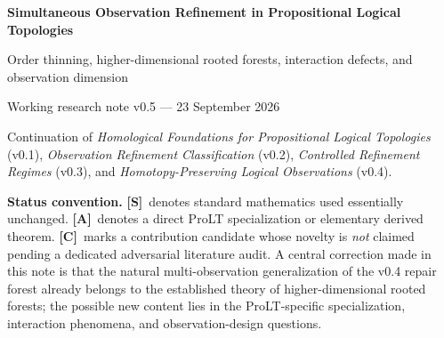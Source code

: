 \documentclass[11pt]{article}
\theoremstyle{definition}
\newcommand{\statusS}{\textbf{[S]}}
\newcommand{\statusA}{\textbf{[A]}}
\newcommand{\statusC}{\textbf{[C]}}
\begin{document}
\begin{center}
{\LARGE\bfseries\color{navy} Simultaneous Observation Refinement in Propositional Logical Topologies}\par
\vspace{0.35em}
{\large Order thinning, higher-dimensional rooted forests, interaction defects, and observation dimension}\par
\vspace{0.7em}
{\normalsize Working research note v0.5 --- 23 September 2026}\par
\vspace{0.3em}
{\small Continuation of \emph{Homological Foundations for Propositional Logical Topologies} (v0.1), \emph{Observation Refinement Classification} (v0.2), \emph{Controlled Refinement Regimes} (v0.3), and \emph{Homotopy-Preserving Logical Observations} (v0.4).}
\end{center}

\vspace{0.8em}
\noindent\colorbox{softgold}{\parbox{0.96\textwidth}{
\textbf{Status convention.} \statusS\ denotes standard mathematics used essentially unchanged. \statusA\ denotes a direct ProLT specialization or elementary derived theorem. \statusC\ marks a contribution candidate whose novelty is \emph{not} claimed pending a dedicated adversarial literature audit. A central correction made in this note is that the natural multi-observation generalization of the v0.4 repair forest already belongs to the established theory of higher-dimensional rooted forests; the possible new content lies in the ProLT-specific specialization, interaction phenomena, and observation-design questions.
}}
\end{document}
